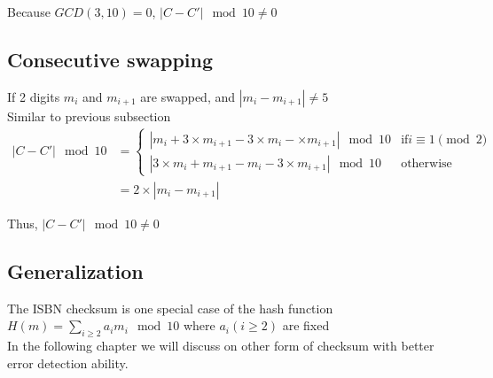 Because $GCD(3, 10) = 0$, $|C-C'| \mod 10 \ne 0$
\subsection{Consecutive swapping}
If 2 digits $m_i$ and $m_{i+1}$ are swapped, and $|m_i-m_{i+1}| \neq 5$\\
Similar to previous subsection
\begin{equation}
\begin{split}
|C - C'| \mod 10 & =
\begin{cases}
|m_i + 3 \times m_{i+1} - 3 \times m_i - \times m_{i+1}| \mod 10 &\text{if} i \equiv 1 \pmod{2}
\\
 |3 \times m_i + m_{i+1} - m_i - 3 \times m_{i+1}| \mod 10 &\text{otherwise}
\end{cases}
\\
& = 2 \times |m_i - m_{i+1}|
\end{split}
\end{equation}

Thus, $|C-C'| \mod 10 \neq 0$

\subsection{Generalization}
The ISBN checksum is one special case of the hash function $H(m) = \sum_{i \geq 2}a_im_i \mod 10$ where $a_i(i \geq 2)$ are fixed\\
In the following chapter we will discuss on other form of checksum with better error detection ability.